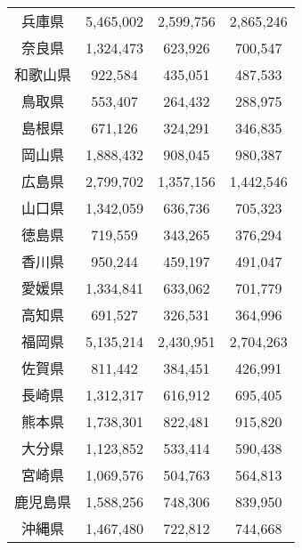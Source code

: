 \documentclass[a4paper, platex, dvipdfmx]{jsarticle}
\begin{document}
\begin{table}
\begin{tabular}{cccc}
    兵庫県 & 5,465,002 & 2,599,756 & 2,865,246 \\
    奈良県 & 1,324,473 & 623,926 & 700,547 \\
    和歌山県 & 922,584 & 435,051 & 487,533 \\
    鳥取県 & 553,407 & 264,432 & 288,975 \\
    島根県 & 671,126 & 324,291 & 346,835 \\
    岡山県 & 1,888,432 & 908,045 & 980,387 \\
    広島県 & 2,799,702 & 1,357,156 & 1,442,546 \\
    山口県 & 1,342,059 & 636,736 & 705,323 \\
    徳島県 & 719,559 & 343,265 & 376,294 \\
    香川県 & 950,244 & 459,197 & 491,047 \\
    愛媛県 & 1,334,841 & 633,062 & 701,779 \\
    高知県 & 691,527 & 326,531 & 364,996 \\
    福岡県 & 5,135,214 & 2,430,951 & 2,704,263 \\
    佐賀県 & 811,442 & 384,451 & 426,991 \\
    長崎県 & 1,312,317 & 616,912 & 695,405 \\
    熊本県 & 1,738,301 & 822,481 & 915,820 \\
    大分県 & 1,123,852 & 533,414 & 590,438 \\
    宮崎県 & 1,069,576 & 504,763 & 564,813 \\
    鹿児島県 & 1,588,256 & 748,306 & 839,950 \\
    沖縄県 & 1,467,480 & 722,812 & 744,668 \\\hline
  \end{tabular}
\end{table}
\end{document}
